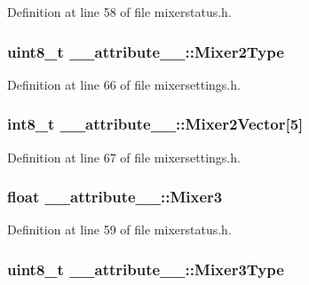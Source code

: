 \-Definition at line 58 of file mixerstatus.\-h.

\hypertarget{struct____attribute_____a068c33552d2c65d8c052528c3384c6a9}{
\subsubsection[{\-Mixer2\-Type}]{\setlength{\rightskip}{0pt plus 5cm}uint8\-\_\-t {\bf \-\_\-\-\_\-attribute\-\_\-\-\_\-\-::\-Mixer2\-Type}}}\label{struct____attribute_____a068c33552d2c65d8c052528c3384c6a9}


\-Definition at line 66 of file mixersettings.\-h.

\hypertarget{struct____attribute_____a5f5b7be71f59053e9801f555be1b01a5}{
\subsubsection[{\-Mixer2\-Vector}]{\setlength{\rightskip}{0pt plus 5cm}int8\-\_\-t {\bf \-\_\-\-\_\-attribute\-\_\-\-\_\-\-::\-Mixer2\-Vector}\mbox{[}5\mbox{]}}}\label{struct____attribute_____a5f5b7be71f59053e9801f555be1b01a5}


\-Definition at line 67 of file mixersettings.\-h.

\hypertarget{struct____attribute_____a85316b61e750255c9eb3fc0874241801}{
\subsubsection[{\-Mixer3}]{\setlength{\rightskip}{0pt plus 5cm}float {\bf \-\_\-\-\_\-attribute\-\_\-\-\_\-\-::\-Mixer3}}}\label{struct____attribute_____a85316b61e750255c9eb3fc0874241801}


\-Definition at line 59 of file mixerstatus.\-h.

\hypertarget{struct____attribute_____a3519d7a574b1601b5d895c2e78705acf}{
\subsubsection[{\-Mixer3\-Type}]{\setlength{\rightskip}{0pt plus 5cm}uint8\-\_\-t {\bf \-\_\-\-\_\-attribute\-\_\-\-\_\-\-::\-Mixer3\-Type}}}\label{struct____attribute_____a3519d7a574b1601b5d895c2e78705acf}


